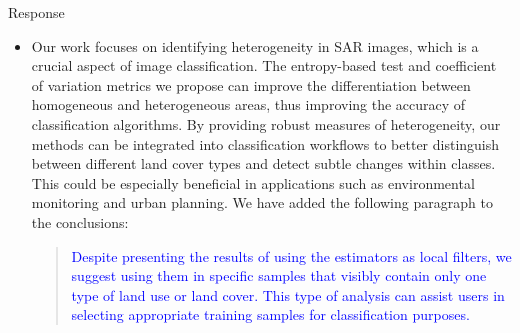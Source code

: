 \documentclass[11pt]{report}
\begin{document}
\begin{responsebox}{Response}
\begin{itemize}
\item Our work focuses on identifying heterogeneity in SAR images, which is a crucial aspect of image classification. 
The entropy-based test and coefficient of variation metrics we propose can improve the differentiation between homogeneous and heterogeneous areas, thus improving the accuracy of classification algorithms. 
By providing robust measures of heterogeneity, our methods can be integrated into classification workflows to better distinguish between different land cover types and detect subtle changes within classes. This could be especially beneficial in applications such as environmental monitoring and urban planning.
We have added the following paragraph to the conclusions:
\begin{quote}
	\textcolor{blue}{Despite presenting the results of using the estimators as local filters, we suggest using them in specific samples that visibly contain only one type of land use or land cover. 
		This type of analysis can assist users in selecting appropriate training samples for classification purposes.}
\end{quote}
\end{itemize}
\end{responsebox}
\end{document}
